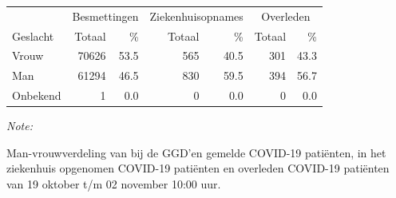 \documentclass[
  english,
  man,floatsintext]{apa6}
\begin{document}
\begin{table}[H]
\centering\begingroup\fontsize{11}{13}\selectfont

\begin{threeparttable}
\begin{tabular}{lrrrrrr}
\toprule
\multicolumn{1}{c}{ } & \multicolumn{2}{c}{Besmettingen} & \multicolumn{2}{c}{Ziekenhuisopnames} & \multicolumn{2}{c}{Overleden} \\
\cmidrule(l{3pt}r{3pt}){2-3} \cmidrule(l{3pt}r{3pt}){4-5} \cmidrule(l{3pt}r{3pt}){6-7}
Geslacht & Totaal & \% & Totaal & \% & Totaal & \%\\
\midrule
Vrouw & 70626 & 53.5 & 565 & 40.5 & 301 & 43.3\\
Man & 61294 & 46.5 & 830 & 59.5 & 394 & 56.7\\
Onbekend & 1 & 0.0 & 0 & 0.0 & 0 & 0.0\\
\bottomrule
\end{tabular}
\begin{tablenotes}
\item \textit{Note: } 
\item Man-vrouwverdeling van bij de GGD’en gemelde COVID-19 patiënten, in het ziekenhuis opgenomen COVID-19 patiënten en overleden COVID-19 patiënten van 19 oktober t/m 02 november 10:00 uur.
\end{tablenotes}
\end{threeparttable}
\endgroup{}
\end{table}
\newpage
\end{document}
